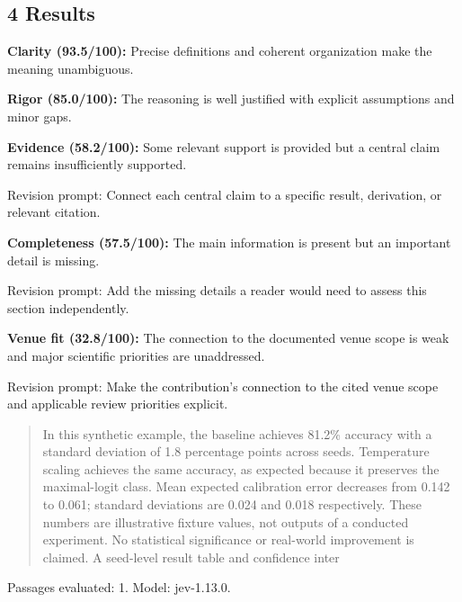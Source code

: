 \documentclass[11pt]{article}
\begin{document}
\subsection{4 Results}
\par\textbf{Clarity (93.5/100):} Precise definitions and coherent organization make the meaning unambiguous.
\par\textbf{Rigor (85.0/100):} The reasoning is well justified with explicit assumptions and minor gaps.
\par\textbf{Evidence (58.2/100):} Some relevant support is provided but a central claim remains insufficiently supported.
\par Revision prompt: Connect each central claim to a specific result, derivation, or relevant citation.
\par\textbf{Completeness (57.5/100):} The main information is present but an important detail is missing.
\par Revision prompt: Add the missing details a reader would need to assess this section independently.
\par\textbf{Venue fit (32.8/100):} The connection to the documented venue scope is weak and major scientific priorities are unaddressed.
\par Revision prompt: Make the contribution's connection to the cited venue scope and applicable review priorities explicit.
\begin{quote}\small In this synthetic example, the baseline achieves 81.2\% accuracy with a standard deviation of 1.8
percentage points across seeds. Temperature scaling achieves the same accuracy, as expected
because it preserves the maximal-logit class. Mean expected calibration error decreases from 0.142 to
0.061; standard deviations are 0.024 and 0.018 respectively. These numbers are illustrative fixture
values, not outputs of a conducted experiment. No statistical significance or real-world improvement is
claimed. A seed-level result table and confidence inter\end{quote}
Passages evaluated: 1. Model: jev-1.13.0.
\end{document}
